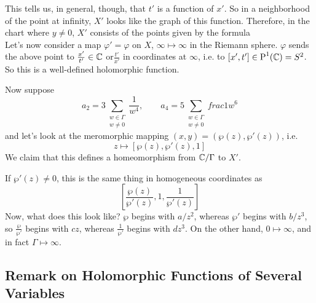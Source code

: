 \documentclass{article}
\begin{document}
This tells us, in general, though, that \(t'\) is a function of \(x'\). So in a neighborhood of the point at infinity, \(X'\) looks like the graph of this function.
Therefore, in the chart where \(y \neq 0\), \(X'\) consists of the points given by the formula
\begin{equation}[x', 1, t' = 4x'^3 - 320a_2x'^7 + ...]\end{equation}
Let's now consider a map \(\varphi' = \varphi\) on \(X\), \(\infty \mapsto \infty\) in the Riemann sphere. \(\varphi\) sends the above point to \(\frac{x'}{t'} \in \mathbb{C}\) or\(\frac{t'}{x'}\) in coordinates at \(\infty\), i.e. to \([x', t'] \in \operatorname{P}^{1}({\mathbb{C}}) = S^2\). So this is a well-defined holomorphic function.

Now suppose
\begin{equation}
a_2 = 3\sum_{\substack{w \in \Gamma \\ w \neq 0}}\frac{1}{w^4},
\qquad a_4 = 5\sum_{\substack{w \in \Gamma \\ w \neq 0}}frac{1}{w^6}
\end{equation}
and let's look at the meromorphic mapping \((x, y) = (\wp(z), \wp'(z))\), i.e.
\begin{equation}z \mapsto [\wp(z), \wp'(z), 1]\end{equation}
We claim that this defines a homeomorphism from \(\mathbb{C}/\Gamma\) to \(X'\).

If \(\wp'(z) \neq 0\), this is the same thing in homogeneous coordinates as
\begin{equation}\left[\frac{\wp(z)}{\wp'(z)}, 1, \frac{1}{\wp'(z)}\right]\end{equation}
Now, what does this look like? \(\wp\) begins with \(a/z^2\), whereas \(\wp'\) begins with \(b/z^3\), so \(\frac{\wp}{\wp'}\) begins with \(cz\), whereas \(\frac{1}{\wp'}\) begins with \(dz^3\). On the other hand, \(0 \mapsto \infty\), and in fact \(\Gamma \mapsto \infty\).








\subsection{Remark on Holomorphic Functions of Several Variables}
\end{document}
